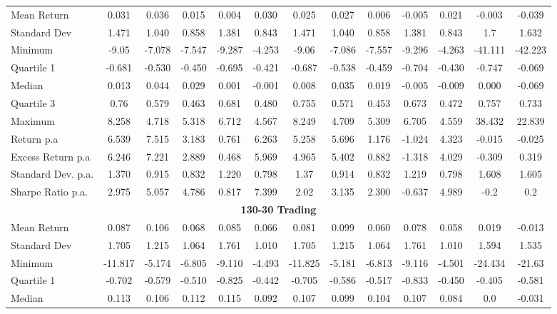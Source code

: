 \documentclass{article}
\begin{document}
\begin{table}[h]
\begin{tabular}{|p{2.4cm}|ccccc|ccccc|cc|}
Mean Return  & 0.031 & 0.036 & 0.015 & 0.004 & 0.030 
& 0.025 & 0.027 & 0.006 & -0.005 & 0.021 
& -0.003 & -0.039
\\
Standard Dev & 1.471 & 1.040 & 0.858 & 1.381 & 0.843 
& 1.471 & 1.040 & 0.858 & 1.381 & 0.843
& 1.7 & 1.632
\\
Minimum  & -9.05 & -7.078 & -7.547 & -9.287 & -4.253 
& -9.06 & -7.086 & -7.557 & -9.296 & -4.263
& -41.111 & -42.223
\\
Quartile 1  & -0.681 & -0.530 & -0.450 & -0.695 & -0.421 
& -0.687 & -0.538 & -0.459 & -0.704 & -0.430 
& -0.747 & -0.069
\\
Median & 0.013 & 0.044 & 0.029 & 0.001 & -0.001 
& 0.008 & 0.035 & 0.019 & -0.005 & -0.009
& 0.000 & -0.069
\\
Quartile 3  & 0.76 & 0.579 & 0.463 & 0.681 & 0.480 
 & 0.755 & 0.571 & 0.453 & 0.673 & 0.472 
 & 0.757 & 0.733
\\
Maximum & 8.258 & 4.718 & 5.318 & 6.712 & 4.567 
& 8.249 & 4.709 & 5.309 & 6.705 & 4.559
  & 38.432 & 22.839
\\
\hline
Return p.a & 6.539 & 7.515 & 3.183 & 0.761 & 6.263 
  & 5.258 & 5.696 & 1.176 & -1.024 & 4.323 
    & -0.015 & -0.025
\\
Excess Return p.a & 6.246 & 7.221 & 2.889 & 0.468 & 5.969 
& 4.965 & 5.402 & 0.882 & -1.318 & 4.029
& -0.309 & 0.319
\\
Standard Dev. p.a.& 1.370 & 0.915 & 0.832 & 1.220 & 0.798 
 & 1.37 & 0.914 & 0.832 & 1.219 & 0.798 
 & 1.608 & 1.605
\\
Sharpe Ratio p.a.& 2.975 & 5.057 & 4.786 & 0.817 & 7.399 
& 2.02 & 3.135 & 2.300 & -0.637 & 4.989
 & -0.2 & 0.2
\\
\hline
\multicolumn{13}{|c|}{\textbf{130-30 Trading}} \\ \hline
Mean Return & 0.087 & 0.106 & 0.068 & 0.085 & 0.066 
& 0.081 & 0.099 & 0.060 & 0.078 & 0.058
& 0.019 & -0.013
\\
Standard Dev & 1.705 & 1.215 & 1.064 & 1.761 & 1.010 
& 1.705 & 1.215 & 1.064 & 1.761 & 1.010
& 1.594 & 1.535
\\
Minimum & -11.817 & -5.174 & -6.805 & -9.110 & -4.493 
& -11.825 & -5.181 & -6.813 & -9.116 & -4.501
& -24.434 & -21.63
\\
Quartile 1 & -0.702 & -0.579 & -0.510 & -0.825 & -0.442 
& -0.705 & -0.586 & -0.517 & -0.833 & -0.450 
& -0.405 & -0.581
\\
Median & 0.113 & 0.106 & 0.112 & 0.115 & 0.092 
& 0.107 & 0.099 & 0.104 & 0.107 & 0.084
& 0.0 &-0.031
\\

\end{tabular}
\end{table}
\end{document}
